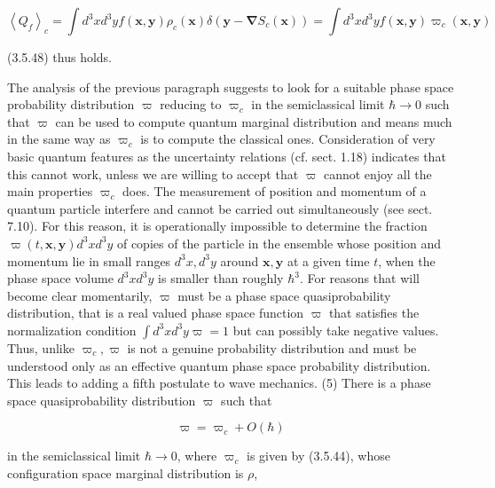 \documentclass{article}
\begin{document}
\begin{equation*}
\left\langle Q_{f}\right\rangle_{c}=\int d^{3} x d^{3} y f(\boldsymbol{x}, \boldsymbol{y}) \rho_{c}(\boldsymbol{x}) \delta\left(\boldsymbol{y}-\boldsymbol{\nabla} S_{c}(\boldsymbol{x})\right)=\int d^{3} x d^{3} y f(\boldsymbol{x}, \boldsymbol{y}) \varpi_{c}(\boldsymbol{x}, \boldsymbol{y}) \tag{3.5.51}
\end{equation*}
 
(3.5.48) thus holds.

The analysis of the previous paragraph suggests to look for a suitable phase space probability distribution $\varpi$ reducing to $\varpi_{c}$ in the semiclassical limit $\hbar \rightarrow 0$ such that $\varpi$ can be used to compute quantum marginal distribution and means much in the same way as $\varpi_{c}$ is to compute the classical ones. Consideration of
very basic quantum features as the uncertainty relations (cf. sect. 1.18) indicates that this cannot work, unless we are willing to accept that $\varpi$ cannot enjoy all the main properties $\varpi_{c}$ does. The measurement of position and momentum of a quantum particle interfere and cannot be carried out simultaneously (see sect. 7.10). For this reason, it is operationally impossible to determine the fraction $\varpi(t, \boldsymbol{x}, \boldsymbol{y}) d^{3} x d^{3} y$ of copies of the particle in the ensemble whose position and momentum lie in small ranges $d^{3} x, d^{3} y$ around $\boldsymbol{x}, \boldsymbol{y}$ at a given time $t$, when the phase space volume $d^{3} x d^{3} y$ is smaller than roughly $\hbar^{3}$. For reasons that will become clear momentarily, $\varpi$ must be a phase space quasiprobability distribution, that is a real valued phase space function $\varpi$ that satisfies the normalization condition $\int d^{3} x d^{3} y \varpi=1$ but can possibly take negative values. Thus, unlike $\varpi_{c}, \varpi$ is not a genuine probability distribution and must be understood only as an effective quantum phase space probability distribution. This leads to adding a fifth postulate to wave mechanics.
(5) There is a phase space quasiprobability distribution $\varpi$ such that
 
\begin{equation*}
\varpi=\varpi_{c}+O(\hbar) \tag{3.5.52}
\end{equation*}
 
in the semiclassical limit $\hbar \rightarrow 0$, where $\varpi_{c}$ is given by (3.5.44), whose configuration space marginal distribution is $\rho$,
 
\end{document}
